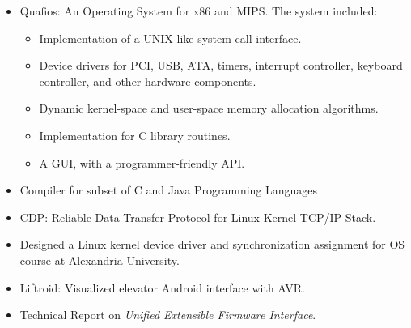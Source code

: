 \documentclass[letterpaper]{twentysecondcv} %
\begin{document}
\begin{itemize}
    \item{Quafios: An Operating System for x86 and MIPS. The system included:
          \begin{itemize}
            \item Implementation of a UNIX-like system call interface.
            \item Device drivers for PCI, USB, ATA, timers, interrupt controller, 
                  keyboard controller, and other hardware components.
            \item Dynamic kernel-space and user-space memory allocation algorithms.
            \item Implementation for C library routines.
            \item A GUI, with a programmer-friendly API.
          \end{itemize}
          }
    \item{Compiler for subset of C and Java Programming Languages}
    \item{CDP: Reliable Data Transfer Protocol for Linux Kernel TCP/IP Stack.}
    \item{Designed a Linux kernel device driver and synchronization assignment 
          for OS course at Alexandria University.}
    \item{Liftroid: Visualized elevator Android interface with AVR.}
    \item{Technical Report on \textit{Unified Extensible Firmware Interface}.}
\end{itemize}
\end{document}
